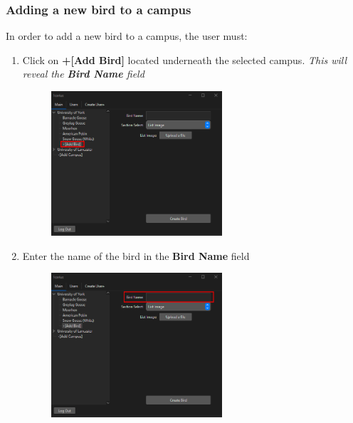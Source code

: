 \subsubsection{Adding a new bird to a campus}
In order to add a new bird to a campus, the user must:
\begin{enumerate}
    \item Click on \textbf{+[Add Bird]} located underneath the selected campus. \textit{This will reveal the \textbf{Bird Name} field}
    \begin{figure}[H]
        \centering
        \includegraphics[width=0.6\textwidth]{MainTab/AddBird/addBird.PNG}
    \end{figure}
    
    \item Enter the name of the bird in the \textbf{Bird Name} field
    \begin{figure}[H]
        \centering
        \includegraphics[width=0.6\textwidth]{MainTab/AddBird/addBirdName.PNG}
    \end{figure}


\end{enumerate}
